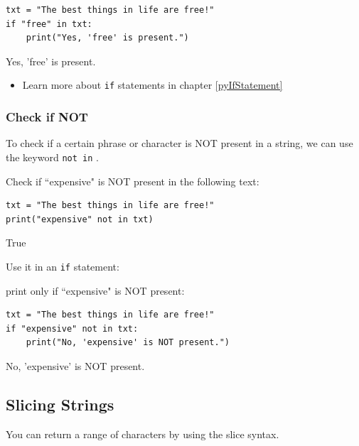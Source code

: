 \documentclass[12pt,a4paper]{article}
\newcommand{\code}[1]{%
	\colorbox{backcolour}{\lstinline{#1}}%
}
\begin{document}
\begin{ebox}
	\begin{lstlisting}
txt = "The best things in life are free!"
if "free" in txt:
    print("Yes, 'free' is present.")
	\end{lstlisting}
\tcblower
	\begin{vercode}
Yes, 'free' is present.
	\end{vercode}
\end{ebox}

\begin{itemize}
	\item Learn more about \code{if} statements in chapter \ref{pyIfStatement}
\end{itemize}
\subsubsection{Check if NOT}
To check if a certain phrase or character is NOT present in a string, we can
use the keyword \code{not in}.

\begin{ebox}
Check if ``expensive" is NOT present in the following text:

	\begin{lstlisting}
txt = "The best things in life are free!"
print("expensive" not in txt)
	\end{lstlisting}
\tcblower
	\begin{vercode}
True
	\end{vercode}
\end{ebox}

Use it in an \code{if} statement:

\begin{ebox}
print only if ``expensive" is NOT present:

	\begin{lstlisting}
txt = "The best things in life are free!"
if "expensive" not in txt:
    print("No, 'expensive' is NOT present.")
	\end{lstlisting}
\tcblower
	\begin{vercode}
No, 'expensive' is NOT present.
	\end{vercode}
\end{ebox}

\subsection{Slicing Strings}
You can return a range of characters by using the slice syntax.
\end{document}
